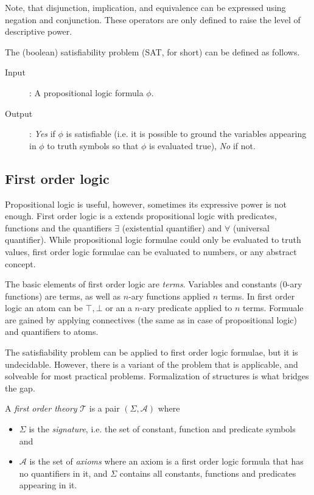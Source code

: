 Note, that disjunction, implication, and equivalence can be expressed using negation and conjunction. These operators are only defined to raise the level of descriptive power.

The (boolean) satisfiability problem (SAT, for short) can be defined as follows.
\begin{description}
	\item[Input]: A propositional logic formula $\phi$.
	\item[Output]: \emph{Yes} if $\phi$ is satisfiable (i.e. it is possible to ground the variables appearing in $\phi$ to truth symbols so that $\phi$ is evaluated true), \emph{No} if not.
\end{description}

\subsection{First order logic}

Propositional logic is useful, however, sometimes its expressive power is not enough. First order logic is a extends propositional logic with predicates, functions and the quantifiers $\exists$ (existential quantifier) and $\forall$ (universal quantifier). While propositional logic formulae could only be evaluated to truth values, first order logic formulae can be evaluated to numbers, or any abstract concept.

The basic elements of first order logic are \emph{terms}. Variables and constants (0-ary functions) are terms, as well as $n$-ary functions applied $n$ terms. In first order logic an atom can be $\top, \bot$ or an a $n$-ary predicate applied to $n$ terms. Formuale are gained by applying connectives (the same as in case of propositional logic) and quantifiers to atoms.

The satisfiability problem can be applied to first order logic formulae, but it is undecidable. However, there is a variant of the problem that is applicable, and solveable for most practical problems. Formalization of structures is what bridges the gap.

\begin{dfn}
	A \emph{first order theory} $\mathcal{T}$ is a pair $(\Sigma,\mathcal{A})$  where
	\begin{itemize}
		\item $\Sigma$ is the \emph{signature}, i.e. the set of constant, function and predicate symbols and
		\item $\mathcal{A}$ is the set of \emph{axioms} where an axiom is a first order logic formula that has no quantifiers in it, and $\Sigma$ contains all constants, functions and predicates appearing in it.
	\end{itemize}
\end{dfn}

